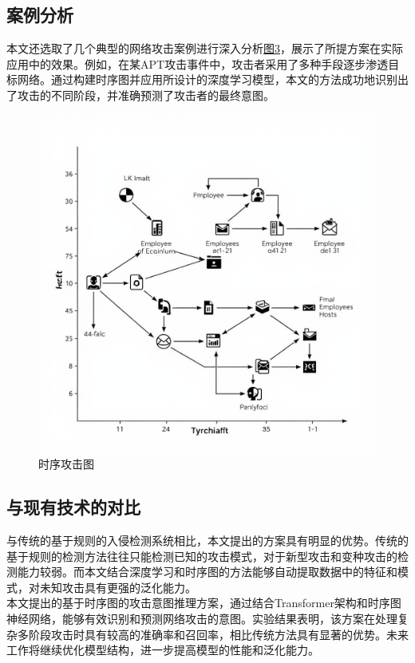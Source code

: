 \documentclass{article} %
\begin{document}
	\subsection{案例分析}
	
	本文还选取了几个典型的网络攻击案例进行深入分析\hyperref[time-order]{图3}，展示了所提方案在实际应用中的效果。例如，在某APT攻击事件中，攻击者采用了多种手段逐步渗透目标网络。通过构建时序图并应用所设计的深度学习模型，本文的方法成功地识别出了攻击的不同阶段，并准确预测了攻击者的最终意图\citep{Silver2016}。
	\begin{figure}
		\begin{center}
			\includegraphics[width=0.6\textheight]{time-order.jpg}
			\caption{时序攻击图}
			\label{time-order}
		\end{center}
	\end{figure}

	\subsection{与现有技术的对比}
	
	与传统的基于规则的入侵检测系统相比，本文提出的方案具有明显的优势。传统的基于规则的检测方法往往只能检测已知的攻击模式，对于新型攻击和变种攻击的检测能力较弱。而本文结合深度学习和时序图的方法能够自动提取数据中的特征和模式，对未知攻击具有更强的泛化能力。\\
	本文提出的基于时序图的攻击意图推理方案，通过结合Transformer架构和时序图神经网络，能够有效识别和预测网络攻击的意图。实验结果表明，该方案在处理复杂多阶段攻击时具有较高的准确率和召回率，相比传统方法具有显著的优势。未来工作将继续优化模型结构，进一步提高模型的性能和泛化能力。
	
\end{document}
